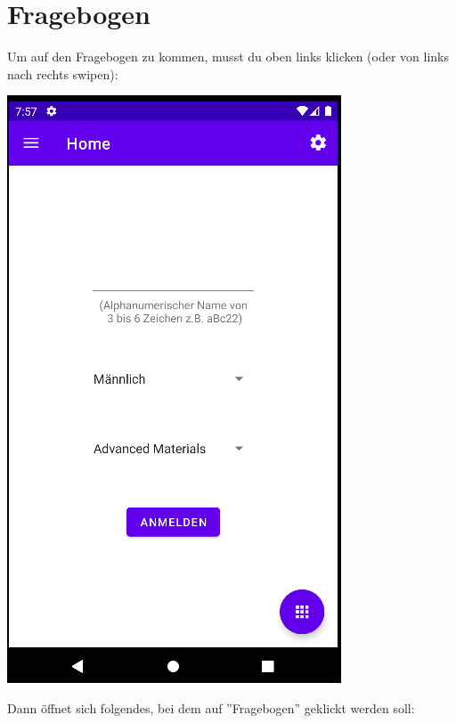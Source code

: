 \documentclass{article}
\begin{document}
\section{Fragebogen}
Um auf den Fragebogen zu kommen, musst du oben links klicken (oder von links nach rechts swipen): 
\begin{center}
    \includegraphics[scale=0.45]{start_reg.png}
\end{center}
Dann öffnet sich folgendes, bei dem auf ''Fragebogen'' geklickt werden soll: 
\end{document}
